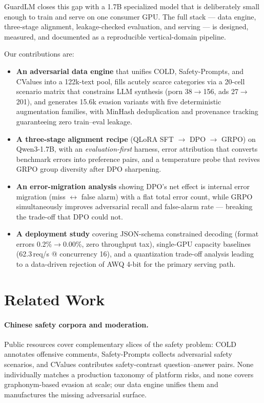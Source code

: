 \documentclass[11pt]{article}
\begin{document}
GuardLM closes this gap with a 1.7B specialized model that is deliberately small enough to train and serve on one consumer GPU. The full stack --- data engine, three-stage alignment, leakage-checked evaluation, and serving --- is designed, measured, and documented as a reproducible vertical-domain pipeline.

Our contributions are:
\begin{itemize}\itemsep1pt
\item \textbf{An adversarial data engine} that unifies COLD, Safety-Prompts, and CValues into a 122k-text pool, fills acutely scarce categories via a 20-cell scenario matrix that constrains LLM synthesis (porn 38$\rightarrow$156, ads 27$\rightarrow$201), and generates 15.6k evasion variants with five deterministic augmentation families, with MinHash deduplication and provenance tracking guaranteeing zero train--eval leakage.
\item \textbf{A three-stage alignment recipe} (QLoRA SFT $\rightarrow$ DPO $\rightarrow$ GRPO) on Qwen3-1.7B, with an \emph{evaluation-first} harness, error attribution that converts benchmark errors into preference pairs, and a temperature probe that revives GRPO group diversity after DPO sharpening.
\item \textbf{An error-migration analysis} showing DPO's net effect is internal error migration (miss $\leftrightarrow$ false alarm) with a flat total error count, while GRPO simultaneously improves adversarial recall and false-alarm rate --- breaking the trade-off that DPO could not.
\item \textbf{A deployment study} covering JSON-schema constrained decoding (format errors 0.2\%$\rightarrow$0.00\%, zero throughput tax), single-GPU capacity baselines (62.3\,req/s @ concurrency 16), and a quantization trade-off analysis leading to a data-driven rejection of AWQ 4-bit for the primary serving path.
\end{itemize}

\section{Related Work}

\paragraph{Chinese safety corpora and moderation.}
Public resources cover complementary slices of the safety problem: COLD \citep{yang2022cold} annotates offensive comments, Safety-Prompts \citep{safetyprompts} collects adversarial safety scenarios, and CValues \citep{cvalues2024} contributes safety-contrast question--answer pairs. None individually matches a production taxonomy of platform risks, and none covers graphonym-based evasion at scale; our data engine unifies them and manufactures the missing adversarial surface.
\end{document}
